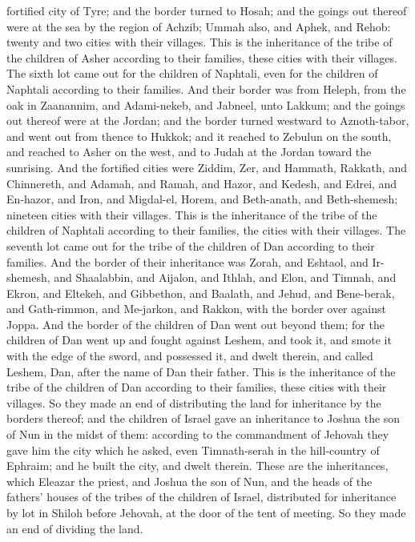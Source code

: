 fortified city of Tyre; and the border turned to Hosah; and the goings out thereof were at the sea by the region of Achzib; Ummah also, and Aphek, and Rehob: twenty and two cities with their villages. This is the inheritance of the tribe of the children of Asher according to their families, these cities with their villages.  The sixth lot came out for the children of Naphtali, even for the children of Naphtali according to their families. And their border was from Heleph, from the oak in Zaanannim, and Adami-nekeb, and Jabneel, unto Lakkum; and the goings out thereof were at the Jordan; and the border turned westward to Aznoth-tabor, and went out from thence to Hukkok; and it reached to Zebulun on the south, and reached to Asher on the west, and to Judah at the Jordan toward the sunrising. And the fortified cities were Ziddim, Zer, and Hammath, Rakkath, and Chinnereth, and Adamah, and Ramah, and Hazor, and Kedesh, and Edrei, and En-hazor, and Iron, and Migdal-el, Horem, and Beth-anath, and Beth-shemesh; nineteen cities with their villages. This is the inheritance of the tribe of the children of Naphtali according to their families, the cities with their villages.  The seventh lot came out for the tribe of the children of Dan according to their families. And the border of their inheritance was Zorah, and Eshtaol, and Ir-shemesh, and Shaalabbin, and Aijalon, and Ithlah, and Elon, and Timnah, and Ekron, and Eltekeh, and Gibbethon, and Baalath, and Jehud, and Bene-berak, and Gath-rimmon, and Me-jarkon, and Rakkon, with the border over against Joppa. And the border of the children of Dan went out beyond them; for the children of Dan went up and fought against Leshem, and took it, and smote it with the edge of the sword, and possessed it, and dwelt therein, and called Leshem, Dan, after the name of Dan their father. This is the inheritance of the tribe of the children of Dan according to their families, these cities with their villages.  So they made an end of distributing the land for inheritance by the borders thereof; and the children of Israel gave an inheritance to Joshua the son of Nun in the midst of them: according to the commandment of Jehovah they gave him the city which he asked, even Timnath-serah in the hill-country of Ephraim; and he built the city, and dwelt therein.  These are the inheritances, which Eleazar the priest, and Joshua the son of Nun, and the heads of the fathers’ houses of the tribes of the children of Israel, distributed for inheritance by lot in Shiloh before Jehovah, at the door of the tent of meeting. So they made an end of dividing the land. 

